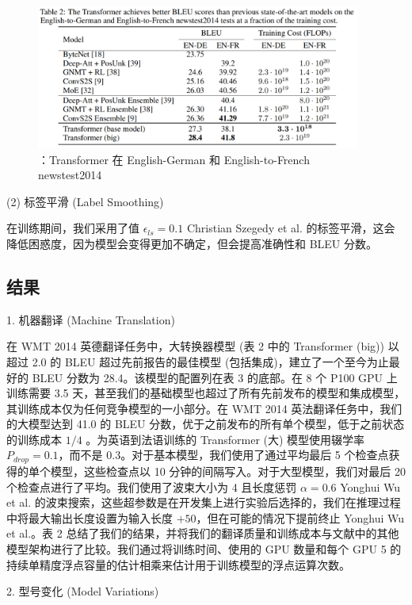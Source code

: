 \begin{figure}[htb]
\centering 
\includegraphics[width=0.95\textwidth]{img/t2.png} 
\caption{：Transformer 在 English-German 和 English-to-French newstest2014}
\label{Test}
\end{figure}

(2) 标签平滑 (Label Smoothing)

在训练期间，我们采用了值 $\epsilon_{l s}=0.1$ Christian Szegedy et al. 的标签平滑，这会降低困惑度，因为模型会变得更加不确定，但会提高准确性和 BLEU 分数。

\subsection{结果}

1. 机器翻译 (Machine Translation)

在 WMT 2014 英德翻译任务中，大转换器模型 (表 2 中的 Transformer (big)) 以超过 2.0 的 BLEU 超过先前报告的最佳模型 (包括集成)，建立了一个至今为止最好的 BLEU 分数为 28.4。该模型的配置列在表 3 的底部。在 8 个 P100 GPU 上训练需要 3.5 天，甚至我们的基础模型也超过了所有先前发布的模型和集成模型，其训练成本仅为任何竞争模型的一小部分。在 WMT 2014 英法翻译任务中，我们的大模型达到 41.0 的 BLEU 分数，优于之前发布的所有单个模型，低于之前状态的训练成本 $1/4$ 。为英语到法语训练的 Transformer (大) 模型使用辍学率 $P_{drop} = 0.1$，而不是 0.3。对于基本模型，我们使用了通过平均最后 5 个检查点获得的单个模型，这些检查点以 10 分钟的间隔写入。对于大型模型，我们对最后 20 个检查点进行了平均。我们使用了波束大小为 4 且长度惩罚 $\alpha=0.6$ Yonghui Wu et al. 的波束搜索，这些超参数是在开发集上进行实验后选择的，我们在推理过程中将最大输出长度设置为输入长度 $+ 50$，但在可能的情况下提前终止 Yonghui Wu et al.。表 2 总结了我们的结果，并将我们的翻译质量和训练成本与文献中的其他模型架构进行了比较。我们通过将训练时间、使用的 GPU 数量和每个 GPU 5 的持续单精度浮点容量的估计相乘来估计用于训练模型的浮点运算次数。

2. 型号变化 (Model Variations)

